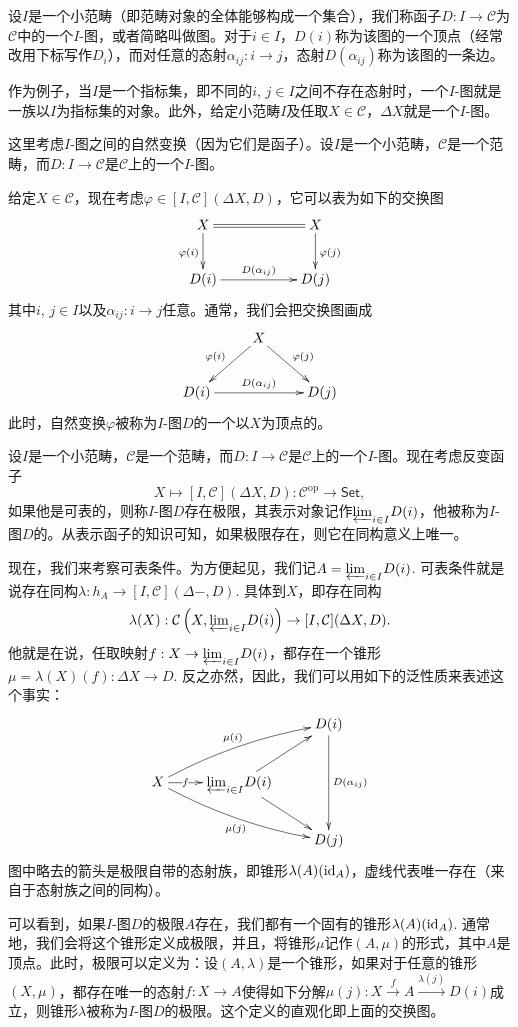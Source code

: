 \para 设$I$是一个小范畴（即范畴对象的全体能够构成一个集合），我们称函子$D:I\to \mathcal{C}$为$\mathcal{C}$中的一个$I$-图，或者简略叫做图。对于$i\in I$，$D(i)$称为该图的一个顶点（经常改用下标写作$D_i$），而对任意的态射$\alpha_{ij}:i\to j$，态射$D(\alpha_{ij})$称为该图的一条边。

作为例子，当$I$是一个指标集，即不同的$i$, $j\in I$之间不存在态射时，一个$I$-图就是一族以$I$为指标集的对象。此外，给定小范畴$I$及任取$X\in \mathcal{C}$，$\Delta X$就是一个$I$-图。

\para 这里考虑$I$-图之间的自然变换（因为它们是函子）。设$I$是一个小范畴，$\mathcal{C}$是一个范畴，而$D:I\to \mathcal{C}$是$\mathcal{C}$上的一个$I$-图。

给定$X\in\mathcal{C}$，现在考虑$\varphi\in [I,\mathcal{C}](\Delta X,D)$，它可以表为如下的交换图
\[
	\xymatrix{
		X\ar@{=}[rr]\ar[d]_{\varphi(i)}&&X\ar[d]^{\varphi(j)}\\
		D(i)\ar[rr]^-{D(\alpha_{ij})}&&D(j)
	}
\]
其中$i$, $j\in I$以及$\alpha_{ij}:i\to j$任意。通常，我们会把交换图画成
\[
	\xymatrix{
		&X\ar[dl]_{\varphi(i)}\ar[dr]^{\varphi(j)}&\\
		D(i)\ar[rr]^-{D(\alpha_{ij})}&&D(j)
	}
\]
此时，自然变换$\varphi$被称为$I$-图$D$的一个以$X$为顶点的。

\para 设$I$是一个小范畴，$\mathcal{C}$是一个范畴，而$D:I\to \mathcal{C}$是$\mathcal{C}$上的一个$I$-图。现在考虑反变函子
\[
	X\mapsto [I,\mathcal{C}](\Delta X,D):\mathcal{C}^{\text{op}}\to \mathsf{Set},
\]
如果他是可表的，则称$I$-图$D$存在极限，其表示对象记作${\varprojlim}_{i\in I} D(i)$，他被称为$I$-图$D$的。从表示函子的知识可知，如果极限存在，则它在同构意义上唯一。

现在，我们来考察可表条件。为方便起见，我们记$A={\varprojlim}_{i\in I} D(i)$. 可表条件就是说存在同构$\lambda:h_{A}\to [I,\mathcal{C}](\Delta -,D)$. 具体到$X$，即存在同构
\[
	\lambda(X):\mathcal{C}\left(X,{\varprojlim}_{i\in I} D(i)\right)\to [I,\mathcal{C}](\Delta X,D).
\]
他就是在说，任取映射$f:X\to {\varprojlim}_{i\in I} D(i)$，都存在一个锥形$\mu=\lambda(X)(f):\Delta X\to D$. 反之亦然，因此，我们可以用如下的泛性质来表述这个事实：
\[
	\xymatrix{
		&&D(i)\ar[dd]^{D(\alpha_{ij})}\\
		X\ar@{-->}[r]|-{f}\ar@/^/[rru]^-{\mu(i)}\ar@/_/[rrd]_{\mu(j)}&{\varprojlim}_{i\in I} D(i)\ar[ru]\ar[rd]&\\
		&&D(j)
	}
\]
图中略去的箭头是极限自带的态射族，即锥形$\lambda(A)(\operatorname{id}_A)$，虚线代表唯一存在（来自于态射族之间的同构）。

可以看到，如果$I$-图$D$的极限$A$存在，我们都有一个固有的锥形$\lambda(A)(\operatorname{id}_A)$. 通常地，我们会将这个锥形定义成极限，并且，将锥形$\mu$记作$(A,\mu)$的形式，其中$A$是顶点。此时，极限可以定义为：设$(A,\lambda)$是一个锥形，如果对于任意的锥形$(X,\mu)$，都存在唯一的态射$f:X\to A$使得如下分解$\mu(j):X\xrightarrow{f}A\xrightarrow{\lambda(j)}D(i)$成立，则锥形$\lambda$被称为$I$-图$D$的极限。这个定义的直观化即上面的交换图。

